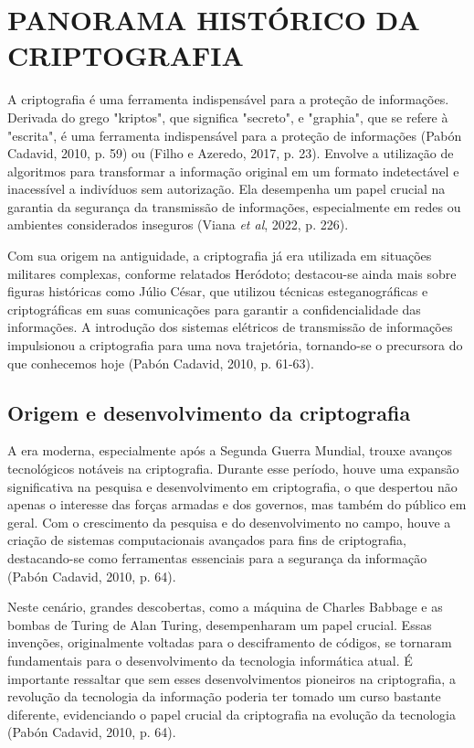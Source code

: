 
\section{PANORAMA HISTÓRICO DA CRIPTOGRAFIA}

A criptografia é uma ferramenta indispensável para a proteção de informações.
Derivada do grego "kriptos", que significa "secreto", e "graphia", que se
refere à "escrita", é uma ferramenta indispensável para a proteção de
informações (Pabón Cadavid, 2010, p. 59) ou (Filho e Azeredo, 2017, p. 23).
Envolve a utilização de algoritmos para transformar a informação original em um
formato indetectável e inacessível a indivíduos sem autorização. Ela desempenha
um papel crucial na garantia da segurança da transmissão de informações,
especialmente em redes ou ambientes considerados inseguros (Viana \textit{et
	al}, 2022, p. 226).

Com sua origem na antiguidade, a criptografia já era utilizada em situações
militares complexas, conforme relatados Heródoto; destacou-se ainda mais
sobre figuras históricas como Júlio César, que utilizou técnicas
esteganográficas e criptográficas em suas comunicações para garantir a
confidencialidade das informações. A introdução dos sistemas elétricos de
transmissão de informações impulsionou a criptografia para uma
nova trajetória, tornando-se o precursora do que conhecemos hoje (Pabón
Cadavid, 2010, p. 61-63).

\subsection{Origem e desenvolvimento da criptografia}

A era moderna, especialmente após a Segunda Guerra Mundial, trouxe avanços
tecnológicos notáveis na criptografia. Durante esse período, houve uma expansão
significativa na pesquisa e desenvolvimento em criptografia, o que despertou
não apenas o interesse das forças armadas e dos governos, mas também do público
em geral. Com o crescimento da pesquisa e do desenvolvimento no campo, houve a
criação de sistemas computacionais avançados para fins de criptografia,
destacando-se como ferramentas essenciais para a segurança da informação (Pabón
Cadavid, 2010, p. 64).

Neste cenário, grandes descobertas, como a máquina de Charles Babbage e as
bombas de Turing de Alan Turing, desempenharam um papel crucial. Essas
invenções, originalmente voltadas para o desciframento de códigos, se tornaram
fundamentais para o desenvolvimento da tecnologia informática atual. É
importante ressaltar que sem esses desenvolvimentos pioneiros na criptografia,
a revolução da tecnologia da informação poderia ter tomado um curso bastante
diferente, evidenciando o papel crucial da criptografia na evolução da
tecnologia (Pabón Cadavid, 2010, p. 64).

